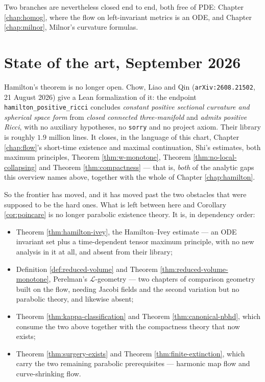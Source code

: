 Two branches are nevertheless closed end to end, both free of PDE: Chapter
\ref{chap:homog}, where the flow on left-invariant metrics is an ODE, and
Chapter \ref{chap:milnor}, Milnor's curvature formulas.

\section*{State of the art, September 2026}

Hamilton's theorem is no longer open. Chow, Liao and Qin
(\texttt{arXiv:2608.21502}, 21 August 2026) give a Lean formalization of it:
the endpoint \texttt{hamilton\_positive\_ricci} concludes
\emph{constant positive sectional curvature and spherical space form} from
\emph{closed connected three-manifold} and \emph{admits positive Ricci},
with no auxiliary hypotheses, no \texttt{sorry} and no project axiom. Their
library is roughly $1.9$ million lines. It closes, in the language of this
chart, Chapter \ref{chap:flow}'s short-time existence and maximal
continuation, Shi's estimates, both maximum principles,
Theorem \ref{thm:w-monotone}, Theorem \ref{thm:no-local-collapsing} and
Theorem \ref{thm:compactness} --- that is, \emph{both} of the analytic gaps
this overview names above, together with the whole of Chapter
\ref{chap:hamilton}.

So the frontier has moved, and it has moved past the two obstacles that were
supposed to be the hard ones. What is left between here and
Corollary \ref{cor:poincare} is no longer parabolic existence theory. It is,
in dependency order:

\begin{itemize}
  \item Theorem \ref{thm:hamilton-ivey}, the Hamilton--Ivey estimate --- an
    ODE invariant set plus a time-dependent tensor maximum principle, with no
    new analysis in it at all, and absent from their library;
  \item Definition \ref{def:reduced-volume} and
    Theorem \ref{thm:reduced-volume-monotone}, Perelman's
    $\mathcal{L}$-geometry --- two chapters of comparison geometry built on
    the flow, needing Jacobi fields and the second variation but no parabolic
    theory, and likewise absent;
  \item Theorem \ref{thm:kappa-classification} and
    Theorem \ref{thm:canonical-nbhd}, which consume the two above together
    with the compactness theory that now exists;
  \item Theorem \ref{thm:surgery-exists} and
    Theorem \ref{thm:finite-extinction}, which carry the two remaining
    parabolic prerequisites --- harmonic map flow and curve-shrinking flow.
\end{itemize}

